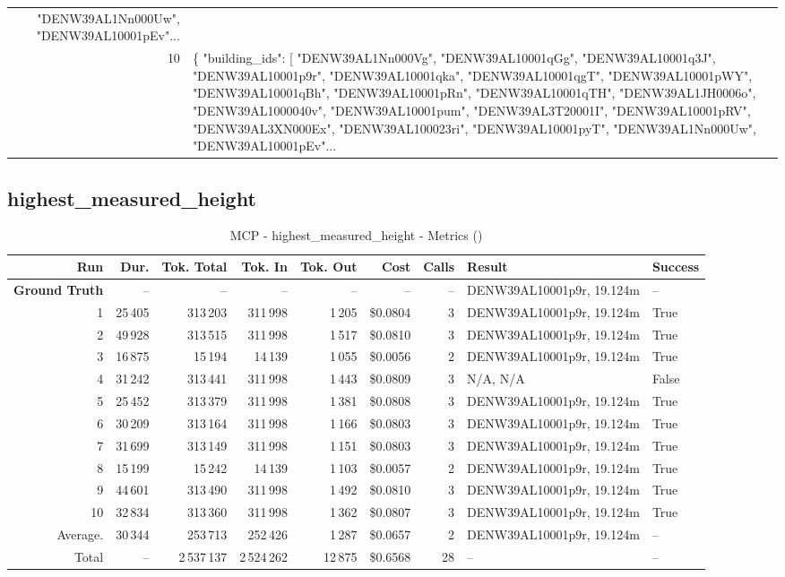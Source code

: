 \documentclass[a4paper,11pt]{article}
\begin{document}
\begin{table}[ht]
\begin{tabular}{r p{12cm}}
    "DENW39AL1Nn000Uw",
    "DENW39AL10001pEv"... \\
10 & \{
  "building\_ids": [
    "DENW39AL1Nn000Vg",
    "DENW39AL10001qGg",
    "DENW39AL10001q3J",
    "DENW39AL10001p9r",
    "DENW39AL10001qka",
    "DENW39AL10001qgT",
    "DENW39AL10001pWY",
    "DENW39AL10001qBh",
    "DENW39AL10001pRn",
    "DENW39AL10001qTH",
    "DENW39AL1JH0006o",
    "DENW39AL1000040v",
    "DENW39AL10001pum",
    "DENW39AL3T20001I",
    "DENW39AL10001pRV",
    "DENW39AL3XN000Ex",
    "DENW39AL100023ri",
    "DENW39AL10001pyT",
    "DENW39AL1Nn000Uw",
    "DENW39AL10001pEv"... \\
\hline
\end{tabular}
\end{table}

\clearpage
\subsection{highest\_measured\_height}

\begin{table}[ht]
\centering
\scriptsize
\caption{MCP - highest\_measured\_height - Metrics ()}
\label{tab:mcp\_highest\_measured\_height\_metrics\_}
\begin{tabular}{r r r r r r r p{3cm} l}
\hline
Run & Dur. & Tok. Total & Tok. In & Tok. Out & Cost & Calls & Result & Success \\
\hline
\textbf{Ground Truth} & -- & -- & -- & -- & -- & -- & DENW39AL10001p9r, 19.124m & -- \\
\hline
1 & 25\,405 & 313\,203 & 311\,998 & 1\,205 & \$0.0804 & 3 & DENW39AL10001p9r, 19.124m & True \\
2 & 49\,928 & 313\,515 & 311\,998 & 1\,517 & \$0.0810 & 3 & DENW39AL10001p9r, 19.124m & True \\
3 & 16\,875 & 15\,194 & 14\,139 & 1\,055 & \$0.0056 & 2 & DENW39AL10001p9r, 19.124m & True \\
4 & 31\,242 & 313\,441 & 311\,998 & 1\,443 & \$0.0809 & 3 & N/A, N/A & False \\
5 & 25\,452 & 313\,379 & 311\,998 & 1\,381 & \$0.0808 & 3 & DENW39AL10001p9r, 19.124m & True \\
6 & 30\,209 & 313\,164 & 311\,998 & 1\,166 & \$0.0803 & 3 & DENW39AL10001p9r, 19.124m & True \\
7 & 31\,699 & 313\,149 & 311\,998 & 1\,151 & \$0.0803 & 3 & DENW39AL10001p9r, 19.124m & True \\
8 & 15\,199 & 15\,242 & 14\,139 & 1\,103 & \$0.0057 & 2 & DENW39AL10001p9r, 19.124m & True \\
9 & 44\,601 & 313\,490 & 311\,998 & 1\,492 & \$0.0810 & 3 & DENW39AL10001p9r, 19.124m & True \\
10 & 32\,834 & 313\,360 & 311\,998 & 1\,362 & \$0.0807 & 3 & DENW39AL10001p9r, 19.124m & True \\
\hline
Average. & 30\,344 & 253\,713 & 252\,426 & 1\,287 & \$0.0657 & 2 & DENW39AL10001p9r, 19.124m & -- \\
Total & -- & 2\,537\,137 & 2\,524\,262 & 12\,875 & \$0.6568 & 28 & -- & -- \\
\hline
\end{tabular}
\end{table}
\end{document}
